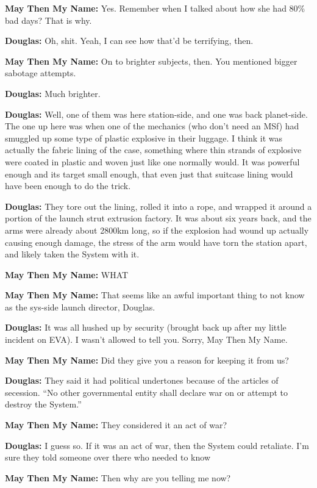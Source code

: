 \textbf{May Then My Name:} Yes. Remember when I talked about how she had 80\% bad days? That is why.

\textbf{Douglas:} Oh, shit. Yeah, I can see how that'd be terrifying, then.

\textbf{May Then My Name:} On to brighter subjects, then. You mentioned bigger sabotage attempts.

\textbf{Douglas:} Much brighter.

\textbf{Douglas:} Well, one of them was here station-side, and one was back planet-side. The one up here was when one of the mechanics (who don't need an MSf) had smuggled up some type of plastic explosive in their luggage. I think it was actually the fabric lining of the case, something where thin strands of explosive were coated in plastic and woven just like one normally would. It was powerful enough and its target small enough, that even just that suitcase lining would have been enough to do the trick.

\textbf{Douglas:} They tore out the lining, rolled it into a rope, and wrapped it around a portion of the launch strut extrusion factory. It was about six years back, and the arms were already about 2800km long, so if the explosion had wound up actually causing enough damage, the stress of the arm would have torn the station apart, and likely taken the System with it.

\textbf{May Then My Name:} WHAT

\textbf{May Then My Name:} That seems like an awful important thing to not know as the sys-side launch director, Douglas.

\textbf{Douglas:} It was all hushed up by security (brought back up after my little incident on EVA). I wasn't allowed to tell you. Sorry, May Then My Name.

\textbf{May Then My Name:} Did they give you a reason for keeping it from us?

\textbf{Douglas:} They said it had political undertones because of the articles of secession. ``No other governmental entity shall declare war on or attempt to destroy the System.''

\textbf{May Then My Name:} They considered it an act of war?

\textbf{Douglas:} I guess so. If it was an act of war, then the System could retaliate. I'm sure they told someone over there who needed to know

\textbf{May Then My Name:} Then why are you telling me now?

